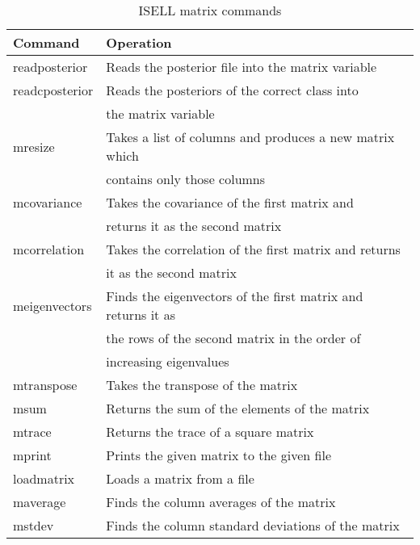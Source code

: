 \documentclass[a4paper,12pt]{book}
\begin{document}
\begin{table}[h!]
\begin{center}
\caption{ISELL matrix commands}
\begin{tabular}{ll}
\hline
Command & Operation  \\
\hline
readposterior & Reads the posterior file into the matrix variable \\
readcposterior & Reads the posteriors of the correct class into \\
              & the matrix variable \\
mresize & Takes a list of columns and produces a new matrix which \\
        & contains only those columns \\
mcovariance & Takes the covariance of the first matrix and \\
            & returns it as the second matrix \\
mcorrelation & Takes the correlation of the first matrix and returns \\
             & it as the second matrix \\
meigenvectors & Finds the eigenvectors of the first matrix and returns it as \\
             & the rows of the second matrix in the order of \\
             & increasing eigenvalues \\
mtranspose  & Takes the transpose of the matrix \\
msum & Returns the sum of the elements of the matrix \\
mtrace & Returns the trace of a square matrix \\
mprint & Prints the given matrix to the given file \\
loadmatrix & Loads a matrix from a file \\
maverage & Finds the column averages of the matrix \\
mstdev & Finds the column standard deviations of the matrix \\
\hline
\end{tabular}
\label{table_matrix_commands}
\end{center}
\end{table}
\end{document}
